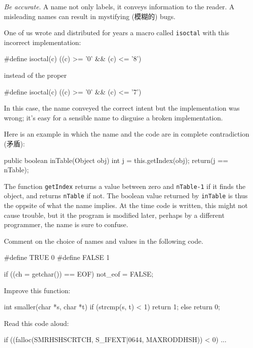 \emph{Be accurate.} A name not only labels, it conveys information to the
reader. A misleading names can result in mystifying (模糊的) bugs.

One of us wrote and distributed for years a macro called \verb"isoctal"
with this incorrect implementation:
\begin{badcode}
    #define isoctal(c) ((c) >= '0' && (c) <= '8')
\end{badcode}
instead of the proper
\begin{wellcode}
    #define isoctal(c) ((c) >= '0' && (c) <= '7')
\end{wellcode}
In this case, the name conveyed the correct intent but the implementation
was wrong; it's easy for a sensible name to disguise a broken
implementation.

Here is an example in which the name and the code are in complete
contradiction (矛盾):
\begin{badcode}
    public boolean inTable(Object obj) {
        int j = this.getIndex(obj);
        return(j == nTable);
    }
\end{badcode}

The function \verb"getIndex" returns a value between zero and
\verb"nTable-1" if it finds the object, and returns \verb"nTable" if not.
The boolean value returned by \verb"inTable" is thus the oppsite of what
the name implies. At the time code is written, this might not cause
trouble, but it the program is modified later, perhaps by a different
programmer, the name is sure to confuse.

\begin{exercise}
Comment on the choice of names and values in the following code.
\begin{badcode}
    #define TRUE    0
    #define FALSE   1

    if ((ch = getchar()) == EOF)
        not_eof = FALSE;
\end{badcode}
\end{exercise}

\begin{exercise}
Improve this function:
\begin{badcode}
    int smaller(char *s, char *t) {
        if (strcmp(s, t) < 1)
            return 1;
        else 
            return 0;
    }
\end{badcode}
\end{exercise}

\begin{exercise}
Read this code aloud:
\begin{badcode}
    if ((falloc(SMRHSHSCRTCH, S_IFEXT|0644, MAXRODDHSH)) < 0)
        ...
\end{badcode}
\end{exercise}

